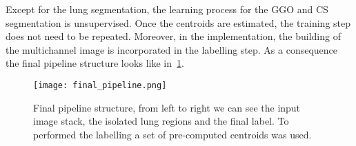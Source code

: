\documentclass{standalone}
\begin{document}
	Except for the lung segmentation, the learning process for the GGO and CS segmentation is unsupervised. Once the centroids are estimated, the training step does not need to be repeated. Moreover, in the implementation, the building of the multichannel image is incorporated in the labelling step. As a consequence the final pipeline structure looks like in \figurename\,\ref{fig:FinalPipeline}.
	
	\begin{figure}[h!]
		\centering
		\texttt{[image: final\_pipeline.png]}
		\caption{Final pipeline structure, from left to right we can see the input image stack, the isolated lung regions and the final label. To performed the labelling a set of pre-computed centroids was used.}\label{fig:FinalPipeline}
	\end{figure}
	
	
	

	
	
	
\end{document}
